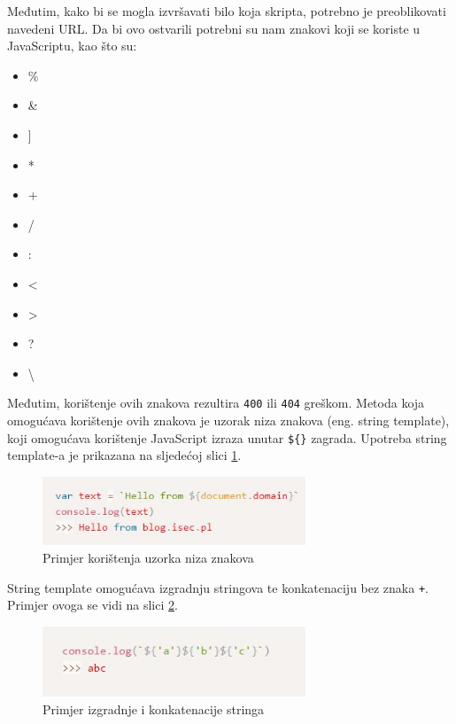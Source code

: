 \documentclass[12pt, oneside, onecolumn]{book}
\begin{document}
{Međutim, kako bi se mogla izvršavati bilo koja skripta, potrebno je preoblikovati navedeni URL. Da bi ovo ostvarili potrebni su nam znakovi koji se koriste u JavaScriptu, kao što su:

\begin{itemize}
\item \%
\item \&
\item ]
\item *
\item +
\item /
\item :
\item <
\item >
\item ?
\item \textbackslash
\end{itemize}

Međutim, korištenje ovih znakova rezultira \texttt{400} ili \texttt{404} greškom. Metoda koja omogućava korištenje ovih znakova je uzorak niza znakova (eng. string template), koji omogućava korištenje JavaScript izraza unutar \texttt{\$\{\}} zagrada. Upotreba string template-a je prikazana na sljedećoj slici \ref{fig:asp_ste}.

\begin{figure}[H]
	\begin{center}
		\includegraphics[width=0.7\textwidth]{asp_ste.jpg}
		\caption{Primjer korištenja uzorka niza znakova} \label{fig:asp_ste}
	\end{center}
\end{figure}

String template omogućava izgradnju stringova te konkatenaciju bez znaka \texttt{+}. Primjer ovoga se vidi na slici \ref{fig:asp_stc}.

\begin{figure}[H]
	\begin{center}
		\includegraphics[width=0.7\textwidth]{asp_stc.jpg}
		\caption{Primjer izgradnje i konkatenacije stringa} \label{fig:asp_stc}
	\end{center}
\end{figure}

}
\end{document}
